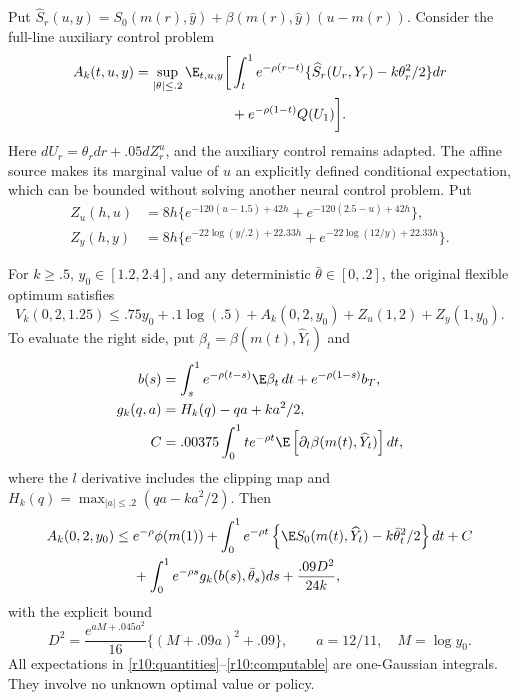 Put $\widehat S_r(u,y)=S_0(m(r),\widehat y)+\beta(m(r),\widehat y)(u-m(r))$. Consider the full-line auxiliary control problem
\begin{align}
 A_k(t,u,y)=\sup_{|\theta|\leq.2}\E_{t,u,y}\bigg[&\int_t^1 e^{-\rho(r-t)}
 \{\widehat S_r(U_r,Y_r)-k\theta_r^2/2\}dr\notag\\
 &+e^{-\rho(1-t)}Q(U_1)\bigg].\label{r10:auxiliary}
\end{align}
Here $dU_r=\theta_rdr+.05dZ^u_r$, and the auxiliary control remains adapted. The affine source makes its marginal value of $u$ an explicitly defined conditional expectation, which can be bounded without solving another neural control problem. Put
\begin{align}
 Z_u(h,u)&=8h\{e^{-120(u-1.5)+42h}+e^{-120(2.5-u)+42h}\},\\
 Z_y(h,y)&=8h\{e^{-22\log(y/.2)+22.33h}+e^{-22\log(12/y)+22.33h}\}.\label{r10:localization}
\end{align}

\begin{theorem}\label{r10:dual}
For $k\geq.5$, $y_0\in[1.2,2.4]$, and any deterministic $\bar\theta\in[0,.2]$, the original flexible optimum satisfies
\begin{equation}
 V_k(0,2,1.25)\leq .75y_0+.1\log(.5)+A_k(0,2,y_0)+Z_u(1,2)+Z_y(1,y_0).\label{r10:dualbound}
\end{equation}
To evaluate the right side, put $\beta_t=\beta(m(t),\widehat Y_t)$ and
\begin{align}
 b(s)&=\int_s^1e^{-\rho(t-s)}\E\beta_t\,dt+e^{-\rho(1-s)}b_T,\\
 g_k(q,a)&=H_k(q)-qa+ka^2/2,\\
 C&=.00375\int_0^1te^{-\rho t}\E\left[\partial_l\beta(m(t),\widehat Y_t)\right]dt,\label{r10:quantities}
\end{align}
where the $l$ derivative includes the clipping map and $H_k(q)=\max_{|a|\leq.2}(qa-ka^2/2)$. Then
\begin{align}
 A_k(0,2,y_0)\leq{}&e^{-\rho}\phi(m(1))+
 \int_0^1e^{-\rho t}\left\{\E S_0(m(t),\widehat Y_t)-k\bar\theta_t^2/2\right\}dt+C\notag\\
 &+\int_0^1e^{-\rho s}g_k(b(s),\bar\theta_s)ds+\frac{.09D^2}{24k},\label{r10:computable}
\end{align}
with the explicit bound
\begin{equation}
 D^2=\frac{e^{aM+.045a^2}}{16}\{(M+.09a)^2+.09\},\qquad
 a=12/11,\quad M=\log y_0.\label{r10:variance}
\end{equation}
All expectations in \eqref{r10:quantities}--\eqref{r10:computable} are one-Gaussian integrals. They involve no unknown optimal value or policy.
\end{theorem}

